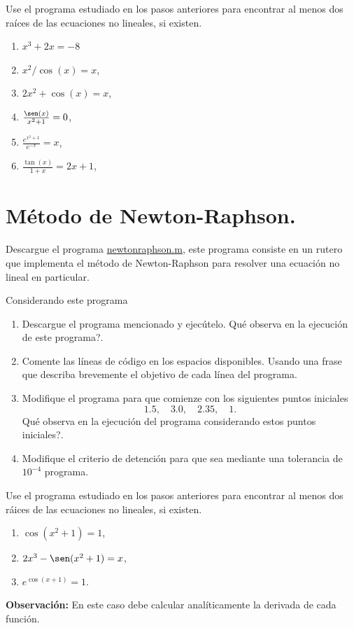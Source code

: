 \documentclass[letter,11pt]{article}
\newcommand\0{\mathbf{0}}
\begin{document}
Use el programa estudiado en los pasos anteriores para encontrar al menos dos ra\'ices de las ecuaciones no lineales, si existen.
\begin{multicols}{3}
\begin{enumerate}
	\item $x^3+2x=-8$
	\item $x^2/\cos(x)=x$,
    \item $2x^2 +\cos(x) =x$,
    \item $\frac{\sen(x)}{x^2+1}=0$,
    \item $\frac{e^{x^2+1}}{e^{-x}}=x$,
    \item $\frac{\tan(x)}{1+x}=2x+1$,
\end{enumerate}
\end{multicols}

\section{M\'etodo de Newton-Raphson.}
Descargue el programa
    \href{ftp://ftp.ing-mat.udec.cl/pub/ing-mat/asignaturas/521230/ejercicios/2018-1/newtonraphson.m}{newtonraphson.m}, este programa consiste en un rutero que implementa el m\'etodo de Newton-Raphson para resolver una ecuaci\'on no lineal en particular.
       
    Considerando este programa
\begin{enumerate}
	\item Descargue el programa mencionado y ejec\'utelo. \textquestiondown Qu\'e observa en la ejecuci\'on de este programa?.
    \item Comente las l\'ineas de c\'odigo en los espacios disponibles. Usando una frase que describa brevemente el objetivo de cada l\'inea del programa.
    \item Modifique el programa para que comienze con los siguientes puntos iniciales
    $$
    1.5, \quad 3.0, \quad 2.35, \quad 1.
    $$
    \textquestiondown Qu\'e observa en la ejecuci\'on del programa considerando estos puntos iniciales?.
   \item Modifique el criterio de detenci\'on para que sea mediante una tolerancia de $10^{-4}$ 
   programa.
\end{enumerate}

Use el programa estudiado en los pasos anteriores para encontrar al menos dos r\'aices de las ecuaciones no lineales, si existen.
\begin{multicols}{3}
\begin{enumerate}
	\item $\cos(x^2+1)=1$,
    \item $2x^3-\sen(x^2+1)=x$,
    \item $e^{\cos(x+1)}=1$.
\end{enumerate}
\end{multicols}
\textbf{Observaci\'on:} En este caso debe calcular anal\'iticamente la derivada de cada funci\'on.
\end{document}
